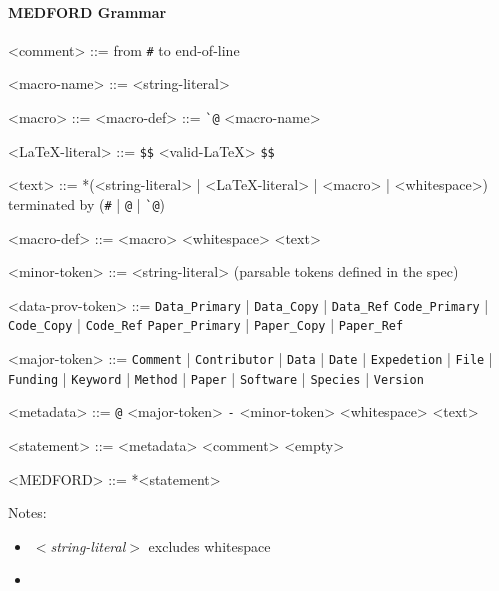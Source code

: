 \documentclass{article}
\begin{document}
\paragraph{MEDFORD Grammar}
\setlength{\grammarindent}{10em} %

\newcommand{\ttt}[1]{\texttt{#1}}

\begin{grammar}

<comment> ::= from \ttt{\#} to end-of-line

<macro-name> ::= <string-literal>

<macro> ::= <macro-def> ::= \ttt{\`{}@} <macro-name>

<\LaTeX-literal> ::= \ttt{\$\$} <valid-\LaTeX> \ttt{\$\$}

<text> ::= *(<string-literal> | <\LaTeX-literal> | <macro> | <whitespace>) terminated by (\ttt{\#} | \ttt{@} | \ttt{\`{}@})

<macro-def> ::= <macro> <whitespace> <text>

<minor-token> ::= <string-literal> (parsable tokens defined in the spec)

<data-prov-token> ::= \ttt{Data\_Primary} | \ttt{Data\_Copy} | \ttt{Data\_Ref}
\alt \ttt{Code\_Primary} | \ttt{Code\_Copy} | \ttt{Code\_Ref}
\alt \ttt{Paper\_Primary} | \ttt{Paper\_Copy} | \ttt{Paper\_Ref}

<major-token> ::= \ttt{Comment} | \ttt{Contributor} | \ttt{Data} | \ttt{Date} | \ttt{Expedetion} | \ttt{File} | \ttt{Funding} | \ttt{Keyword} | \ttt{Method} | \ttt{Paper} | \ttt{Software} | \ttt{Species} | \ttt{Version}

<metadata> ::= \ttt{@} <major-token> \ttt{-} <minor-token> <whitespace> <text>

<statement> ::= <metadata>
\alt <comment>
\alt <empty>

<MEDFORD> ::= *<statement>

\end{grammar}

\bigskip

Notes: 
\begin{itemize}
    \item \textit{\(<\)string-literal\(>\)} excludes whitespace
    \item 
\end{itemize}

%  




\end{document}
